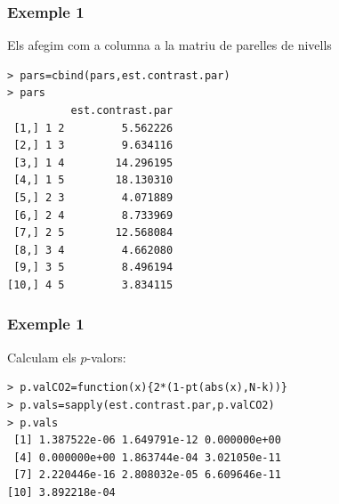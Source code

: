 \documentclass[12pt,t]{beamer}
\theoremstyle{plain}
\theoremstyle{definition}
\begin{document}
\begin{frame}[fragile]
\frametitle{Exemple 1}
Els afegim com a columna a la matriu de parelles de nivells
\begin{verbatim}
> pars=cbind(pars,est.contrast.par)
> pars
          est.contrast.par
 [1,] 1 2         5.562226
 [2,] 1 3         9.634116
 [3,] 1 4        14.296195
 [4,] 1 5        18.130310
 [5,] 2 3         4.071889
 [6,] 2 4         8.733969
 [7,] 2 5        12.568084
 [8,] 3 4         4.662080
 [9,] 3 5         8.496194
[10,] 4 5         3.834115
\end{verbatim}

\end{frame}

\begin{frame}[fragile]
\frametitle{Exemple 1}
Calculam els $p$-valors:

\begin{verbatim}
> p.valCO2=function(x){2*(1-pt(abs(x),N-k))}
> p.vals=sapply(est.contrast.par,p.valCO2)
> p.vals
 [1] 1.387522e-06 1.649791e-12 0.000000e+00
 [4] 0.000000e+00 1.863744e-04 3.021050e-11
 [7] 2.220446e-16 2.808032e-05 6.609646e-11
[10] 3.892218e-04
\end{verbatim}

\end{frame}
\end{document}
